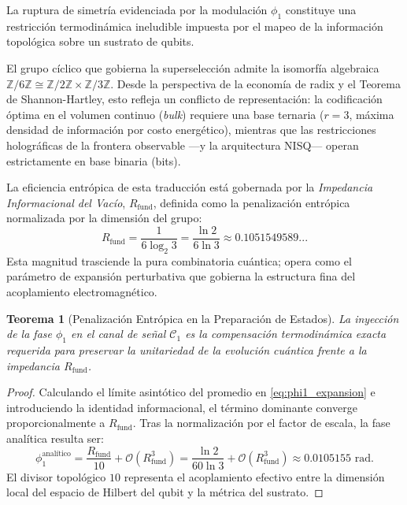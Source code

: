 \documentclass[12pt,a4paper]{article}
\theoremstyle{plain}
\newtheorem{teorema}{Teorema}[section]
\theoremstyle{definition}
\theoremstyle{remark}
\newcommand{\Rfund}{R_{\text{fund}}}
\begin{document}
La ruptura de simetría evidenciada por la modulación $\phi_1$ constituye una restricción termodinámica ineludible impuesta por el mapeo de la información topológica sobre un sustrato de qubits. 

El grupo cíclico que gobierna la superselección admite la isomorfía algebraica $\mathbb{Z}/6\mathbb{Z} \cong \mathbb{Z}/2\mathbb{Z} \times \mathbb{Z}/3\mathbb{Z}$. Desde la perspectiva de la economía de radix y el Teorema de Shannon-Hartley, esto refleja un conflicto de representación: la codificación óptima en el volumen continuo (\textit{bulk}) requiere una base ternaria ($r=3$, máxima densidad de información por costo energético), mientras que las restricciones holográficas de la frontera observable —y la arquitectura NISQ— operan estrictamente en base binaria (bits).

La eficiencia entrópica de esta traducción está gobernada por la \textit{Impedancia Informacional del Vacío}, $R_{\text{fund}}$, definida como la penalización entrópica normalizada por la dimensión del grupo:
\begin{equation}
    R_{\text{fund}} = \frac{1}{6 \log_2 3} = \frac{\ln 2}{6 \ln 3} \approx 0.1051549589...
    \label{eq:rfund_def}
\end{equation}
Esta magnitud trasciende la pura combinatoria cuántica; opera como el parámetro de expansión perturbativa que gobierna la estructura fina del acoplamiento electromagnético.

\begin{teorema}[Penalización Entrópica en la Preparación de Estados]
La inyección de la fase $\phi_1$ en el canal de señal $\mathcal{C}_1$ es la compensación termodinámica exacta requerida para preservar la unitariedad de la evolución cuántica frente a la impedancia $R_{\text{fund}}$. 
\end{teorema}

\begin{proof}
Calculando el límite asintótico del promedio en \eqref{eq:phi1_expansion} e introduciendo la identidad informacional, el término dominante converge proporcionalmente a $\Rfund$. Tras la normalización por el factor de escala, la fase analítica resulta ser:
\begin{equation}
    \phi_1^{\text{analítico}} = \frac{R_{\text{fund}}}{10} + \mathcal{O}(R_{\text{fund}}^3) = \frac{\ln 2}{60 \ln 3} + \mathcal{O}(R_{\text{fund}}^3) \approx 0.0105155 \text{ rad}.
\end{equation}
El divisor topológico $10$ representa el acoplamiento efectivo entre la dimensión local del espacio de Hilbert del qubit y la métrica del sustrato. 
\end{proof}
\end{document}
